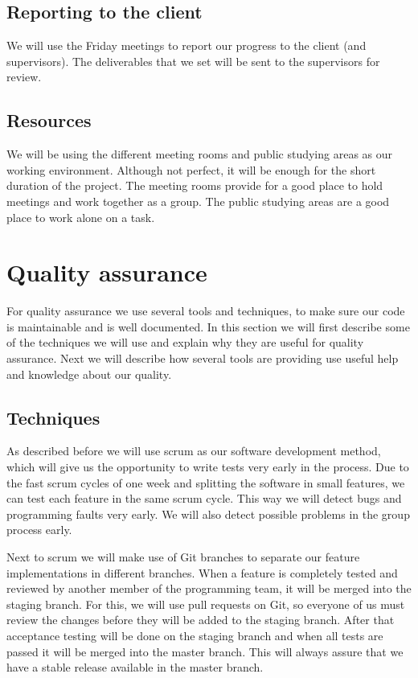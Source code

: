 \subsection*{Reporting to the client}
We will use the Friday meetings to report our progress to the client (and supervisors).
The deliverables that we set will be sent to the supervisors for review.

\subsection*{Resources}
We will be using the different meeting rooms and public studying areas as our working environment.
Although not perfect, it will be enough for the short duration of the project.
The meeting rooms provide for a good place to hold meetings and work together as a group.
The public studying areas are a good place to work alone on a task.

\section*{Quality assurance}
For quality assurance we use several tools and techniques, to make sure our code is maintainable and is well documented.
In this section we will first describe some of the techniques we will use and explain why they are useful for quality assurance.
Next we will describe how several tools are providing use useful help and knowledge about our quality.

\subsection*{Techniques}
As described before we will use scrum as our software development method, which will give us the opportunity to write tests very early in the process.
Due to the fast scrum cycles of one week and splitting the software in small features, we can test each feature in the same scrum cycle.
This way we will detect bugs and programming faults very early.
We will also detect possible problems in the group process early.

Next to scrum we will make use of Git branches to separate our feature implementations in different branches.
When a feature is completely tested and reviewed by another member of the programming team, it will be merged into the staging branch.
For this, we will use pull requests on Git, so everyone of us must review the changes before they will be added to the staging branch.
After that acceptance testing will be done on the staging branch and when all tests are passed it will be merged into the master branch.
This will always assure that we have a stable release available in the master branch.

